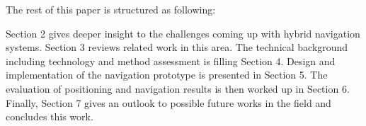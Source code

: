 The rest of this paper is structured as following:

Section 2 gives deeper insight to the challenges coming up with hybrid navigation systems. Section 3 reviews related work in this area. The technical background including technology and method assessment is filling Section 4. Design and implementation of the navigation prototype is presented in Section 5. The evaluation of positioning and navigation results is then worked up in Section 6. Finally, Section 7 gives an outlook to possible future works in the field and concludes this work.

